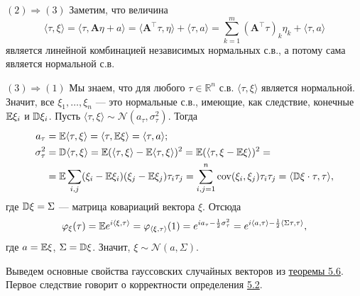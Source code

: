 {    \vspace{10pt}
    $(2) \Rightarrow (3)$ Заметим, что величина
    $$ \langle \tau, \xi \rangle = \langle \tau, \mathbf{A}\eta + a \rangle = \langle \mathbf{A}^\top\tau, \eta \rangle + \langle \tau, a \rangle = \sum_{k=1}^m (\mathbf{A}^\top\tau)_k\eta_k + \langle \tau, a \rangle $$
    является линейной комбинацией независимых нормальных с.в., а потому сама является нормальной с.в.
    
    \vspace{10pt}
    $(3) \Rightarrow (1)$ Мы знаем, что для любого $\tau \in \mathbb{R}^n$ с.в. $\langle \tau, \xi \rangle$ является нормальной. Значит, все $\xi_1, \dots, \xi_n$ --- это нормальные с.в., имеющие, как следствие, конечные $\mathbb{E}\xi_i$ и $\mathbb{D}\xi_i$. Пусть $\langle \tau, \xi \rangle \sim \mathcal{N}(a_\tau, \sigma_\tau^2)$. Тогда
    \begin{align*}
    a_\tau &= \mathbb{E}\langle \tau, \xi \rangle = \langle \tau, \mathbb{E}\xi \rangle = \langle \tau, a \rangle; \\
    \sigma_\tau^2 &= \mathbb{D}\langle \tau, \xi \rangle = \mathbb{E}(\langle \tau, \xi \rangle - \mathbb{E}\langle \tau, \xi \rangle)^2 = \mathbb{E}(\langle \tau, \xi - \mathbb{E}\xi \rangle)^2 = \\
    &= \mathbb{E} \sum_{i,j} (\xi_i - \mathbb{E}\xi_i)(\xi_j - \mathbb{E}\xi_j)\tau_i\tau_j = \sum_{i,j=1}^n \operatorname{cov}(\xi_i, \xi_j)\tau_i\tau_j = \langle \mathbb{D}\xi \cdot \tau, \tau \rangle,
    \end{align*}
    где $\mathbb{D}\xi = \Sigma$ --- матрица ковариаций вектора $\xi$. Отсюда
    $$ \varphi_\xi(\tau) = \mathbb{E} e^{i\langle \xi, \tau \rangle} = \varphi_{\langle \xi, \tau \rangle}(1) = e^{ia_\tau - \frac{1}{2}\sigma_\tau^2} = e^{i\langle a, \tau \rangle - \frac{1}{2}\langle \Sigma\tau, \tau \rangle}, $$
    где $a = \mathbb{E}\xi$, $\Sigma = \mathbb{D}\xi$. Значит, $\xi \sim \mathcal{N}(a, \Sigma)$.
}

\vspace{10pt}

Выведем основные свойства гауссовских случайных векторов из \hyperref[thm:three_def]{теоремы 5.6}. Первое следствие говорит о корректности определения \hyperref[def:gaussian]{5.2}.

\vspace{10pt}


\vspace{5pt}

